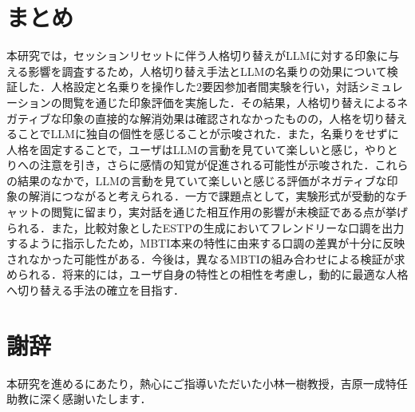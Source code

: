\documentclass[10pt,twocolumn]{jsarticle}
\begin{document}
\section{まとめ}
本研究では，セッションリセットに伴う人格切り替えがLLMに対する印象に与える影響を調査するため，人格切り替え手法とLLMの名乗りの効果について検証した．人格設定と名乗りを操作した2要因参加者間実験を行い，対話シミュレーションの閲覧を通じた印象評価を実施した．その結果，人格切り替えによるネガティブな印象の直接的な解消効果は確認されなかったものの，人格を切り替えることでLLMに独自の個性を感じることが示唆された．また，名乗りをせずに人格を固定することで，ユーザはLLMの言動を見ていて楽しいと感じ，やりとりへの注意を引き，さらに感情の知覚が促進される可能性が示唆された．これらの結果のなかで，LLMの言動を見ていて楽しいと感じる評価がネガティブな印象の解消につながると考えられる．一方で課題点として，実験形式が受動的なチャットの閲覧に留まり，実対話を通じた相互作用の影響が未検証である点が挙げられる．また，比較対象としたESTPの生成においてフレンドリーな口調を出力するように指示したため，MBTI本来の特性に由来する口調の差異が十分に反映されなかった可能性がある．今後は，異なるMBTIの組み合わせによる検証が求められる．将来的には，ユーザ自身の特性との相性を考慮し，動的に最適な人格へ切り替える手法の確立を目指す．

\section*{謝辞}

本研究を進めるにあたり，熱心にご指導いただいた小林一樹教授，吉原一成特任助教に深く感謝いたします．
\end{document}
